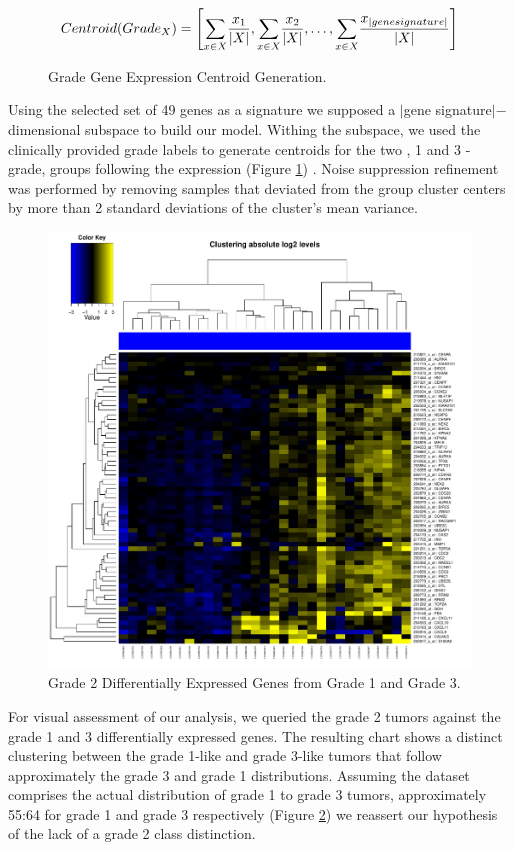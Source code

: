 \documentclass[a4paper,10pt]{article}
\begin{document}
\begin{figure}
$$
Centroid(Grade_X)= \left[              \underset{x\in X}     \sum{  { {x_1}    \over {| X |} } }   ,   
 \underset{x\in X}     \sum{  { {x_2}    \over {| X |} } },
\ldots ,
 \underset{x\in X}     \sum{  { {x_{| gene signature |}}    \over {| X |} } }                 \right] 
$$
\caption{Grade Gene Expression Centroid Generation.}\label{centroid}
\end{figure}
Using the selected set of 49 genes as a signature we supposed a $|$gene signature$|-$dimensional subspace to build our model.
Withing the subspace, we used the clinically provided grade labels to generate centroids for the two , 1 and 3 - grade, groups following
the expression (Figure \ref{centroid}) . Noise suppression refinement was performed by removing samples that deviated from the group cluster
centers by more than 2 standard deviations of the cluster's mean variance.\\

\begin{figure}
\centering
\includegraphics[scale=0.33]{docs/grade2onupregulated3}
\caption{Grade 2 Differentially Expressed Genes from Grade 1 and Grade 3.}\label{grade2up}
\end{figure}
For visual assessment of our analysis, we queried the grade 2 tumors against the grade 1 and 3 differentially expressed genes. The resulting chart
shows a distinct clustering between the grade 1-like and grade 3-like tumors that follow approximately 
the grade 3 and grade 1 distributions. Assuming the dataset comprises the actual distribution 
of grade 1 to grade 3 tumors, approximately 55:64 for grade 1 and grade 3 respectively (Figure \ref{grade2up}) we reassert our hypothesis
of the lack of a grade 2 class distinction.
\end{document}
